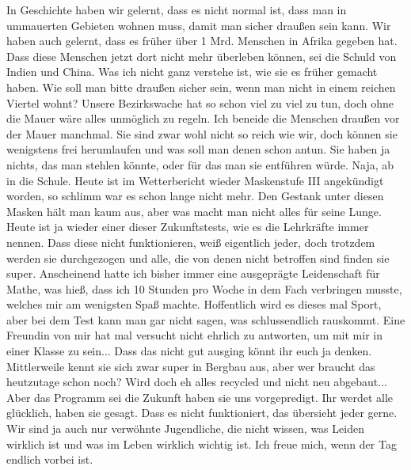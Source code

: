 \documentclass[twoside, a4paper, DIV=11, open=any, bibliography=totoc]{scrbook}
\newcommand{\Quote}[1]{\glqq #1\grqq{}}
\begin{document}
In Geschichte haben wir gelernt, dass es nicht normal ist, dass man in ummauerten
Gebieten wohnen muss, damit
man sicher draußen sein kann. Wir haben auch gelernt, dass es früher über 1 Mrd.
Menschen in Afrika gegeben hat.
Dass diese Menschen jetzt dort nicht mehr überleben können, sei die Schuld von
Indien und China.
Was ich nicht ganz
verstehe ist, wie sie es früher gemacht haben. Wie soll man bitte draußen sicher
sein, wenn man nicht in einem
reichen Viertel wohnt? Unsere Bezirkswache hat so schon viel zu viel zu tun, doch
ohne die Mauer wäre alles
unmöglich zu regeln. Ich beneide die Menschen draußen vor der Mauer manchmal.
Sie sind zwar wohl nicht so reich wie wir, doch können sie wenigstens frei
herumlaufen und was soll
man denen schon antun. Sie haben ja nichts, das man stehlen könnte, oder für das
man sie entführen würde.
Naja, ab in die Schule. 
Heute ist im Wetterbericht wieder Maskenstufe III angekündigt worden,
so schlimm war es schon lange nicht mehr. Den Gestank unter diesen Masken hält man kaum
aus, aber was macht man nicht alles für seine Lunge.
Heute ist ja wieder einer dieser \Quote{Zukunftstests}, wie es
die Lehrkräfte immer nennen.
Dass diese nicht funktionieren, weiß eigentlich jeder, doch trotzdem werden sie
durchgezogen und alle, die
von denen nicht betroffen sind finden sie super. Anscheinend hatte ich bisher immer
eine ausgeprägte Leidenschaft für Mathe, was hieß, dass ich 10 Stunden pro Woche in
dem Fach verbringen musste,
welches mir am wenigsten Spaß machte. Hoffentlich wird es dieses mal Sport, aber
bei dem Test kann man gar nicht
sagen, was schlussendlich rauskommt. Eine Freundin von mir hat mal versucht nicht
ehrlich zu antworten, um
mit mir in einer Klasse zu sein... Dass das nicht gut ausging könnt ihr euch ja
denken. Mittlerweile kennt
sie sich zwar super in Bergbau aus, aber wer braucht das heutzutage schon noch?
Wird doch eh alles recycled und
nicht neu abgebaut... Aber das Programm sei die Zukunft haben sie uns vorgepredigt.
Ihr werdet alle glücklich,
haben sie gesagt. Dass es nicht funktioniert, das übersieht jeder gerne. Wir sind
ja auch nur verwöhnte
Jugendliche, die nicht wissen, was Leiden wirklich ist und was im Leben wirklich wichtig
ist.
Ich freue mich, wenn der Tag endlich vorbei ist.

\vspace{10pt}
\end{document}
